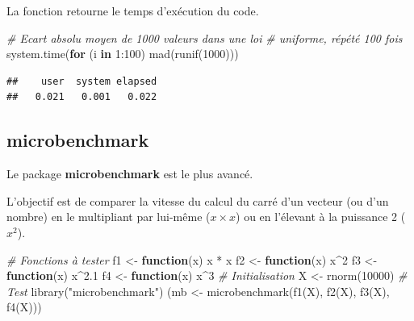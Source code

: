 \documentclass[
  11pt,
  french,
  a4paper,
  extrafontsizes,onecolumn,openright
  ]{memoir}
\newenvironment{Shaded}{\begin{snugshade}}{\end{snugshade}}
\newcommand{\CommentTok}[1]{\textcolor[rgb]{0.56,0.35,0.01}{\textit{#1}}}
\newcommand{\ControlFlowTok}[1]{\textcolor[rgb]{0.13,0.29,0.53}{\textbf{#1}}}
\newcommand{\DecValTok}[1]{\textcolor[rgb]{0.00,0.00,0.81}{#1}}
\newcommand{\FloatTok}[1]{\textcolor[rgb]{0.00,0.00,0.81}{#1}}
\newcommand{\FunctionTok}[1]{\textcolor[rgb]{0.00,0.00,0.00}{#1}}
\newcommand{\NormalTok}[1]{#1}
\newcommand{\OtherTok}[1]{\textcolor[rgb]{0.56,0.35,0.01}{#1}}
\newcommand{\SpecialCharTok}[1]{\textcolor[rgb]{0.00,0.00,0.00}{#1}}
\newcommand{\StringTok}[1]{\textcolor[rgb]{0.31,0.60,0.02}{#1}}
\begin{document}
La fonction retourne le temps d'exécution du code.

\scriptsize

\begin{Shaded}
\begin{Highlighting}[]
\CommentTok{\# Ecart absolu moyen de 1000 valeurs dans une loi}
\CommentTok{\# uniforme, répété 100 fois}
\FunctionTok{system.time}\NormalTok{(}\ControlFlowTok{for}\NormalTok{ (i }\ControlFlowTok{in} \DecValTok{1}\SpecialCharTok{:}\DecValTok{100}\NormalTok{) }\FunctionTok{mad}\NormalTok{(}\FunctionTok{runif}\NormalTok{(}\DecValTok{1000}\NormalTok{)))}
\end{Highlighting}
\end{Shaded}

\begin{verbatim}
##    user  system elapsed 
##   0.021   0.001   0.022
\end{verbatim}

\normalsize

\hypertarget{microbenchmark}{%
\subsection{microbenchmark}\label{microbenchmark}}

Le package \textbf{microbenchmark} est le plus avancé.

L'objectif est de comparer la vitesse du calcul du carré d'un vecteur (ou d'un nombre) en le multipliant par lui-même (\(x \times x\)) ou en l'élevant à la puissance 2 (\(x^2\)).

\scriptsize

\begin{Shaded}
\begin{Highlighting}[]
\CommentTok{\# Fonctions à tester}
\NormalTok{f1 }\OtherTok{\textless{}{-}} \ControlFlowTok{function}\NormalTok{(x) x }\SpecialCharTok{*}\NormalTok{ x}
\NormalTok{f2 }\OtherTok{\textless{}{-}} \ControlFlowTok{function}\NormalTok{(x) x}\SpecialCharTok{\^{}}\DecValTok{2}
\NormalTok{f3 }\OtherTok{\textless{}{-}} \ControlFlowTok{function}\NormalTok{(x) x}\SpecialCharTok{\^{}}\FloatTok{2.1}
\NormalTok{f4 }\OtherTok{\textless{}{-}} \ControlFlowTok{function}\NormalTok{(x) x}\SpecialCharTok{\^{}}\DecValTok{3}
\CommentTok{\# Initialisation}
\NormalTok{X }\OtherTok{\textless{}{-}} \FunctionTok{rnorm}\NormalTok{(}\DecValTok{10000}\NormalTok{)}
\CommentTok{\# Test}
\FunctionTok{library}\NormalTok{(}\StringTok{"microbenchmark"}\NormalTok{)}
\NormalTok{(mb }\OtherTok{\textless{}{-}} \FunctionTok{microbenchmark}\NormalTok{(}\FunctionTok{f1}\NormalTok{(X), }\FunctionTok{f2}\NormalTok{(X), }\FunctionTok{f3}\NormalTok{(X), }\FunctionTok{f4}\NormalTok{(X)))}
\end{Highlighting}
\end{Shaded}
\end{document}
